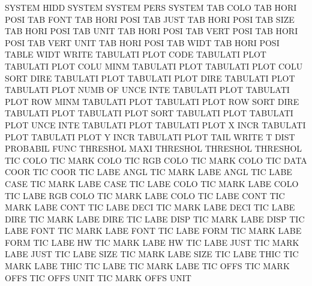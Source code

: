 SYSTEM   HIDD                           SYSTEM
SYSTEM   PERS                           SYSTEM
TAB      COLO                           TAB HORI POSI
TAB      FONT                           TAB HORI POSI
TAB      JUST                           TAB HORI POSI
TAB      SIZE                           TAB HORI POSI
TAB      UNIT                           TAB HORI POSI
TAB      VERT POSI                      TAB HORI POSI
TAB      VERT UNIT                      TAB HORI POSI
TAB      WIDT                           TAB HORI POSI
TABLE    WIDT                           WRITE
TABULATI PLOT CODE                      TABULATI PLOT
TABULATI PLOT COLU MINM                 TABULATI PLOT
TABULATI PLOT COLU SORT DIRE            TABULATI PLOT
TABULATI PLOT DIRE                      TABULATI PLOT
TABULATI PLOT NUMB OF   UNCE INTE       TABULATI PLOT
TABULATI PLOT ROW  MINM                 TABULATI PLOT
TABULATI PLOT ROW  SORT DIRE            TABULATI PLOT
TABULATI PLOT SORT                      TABULATI PLOT
TABULATI PLOT UNCE INTE                 TABULATI PLOT
TABULATI PLOT X    INCR                 TABULATI PLOT
TABULATI PLOT Y    INCR                 TABULATI PLOT
TAIL                                    WRITE
T        DIST                           PROBABIL FUNC
THRESHOL MAXI                           THRESHOL
THRESHOL                                THRESHOL
TIC      COLO                           TIC      MARK COLO
TIC      RGB  COLO                      TIC      MARK COLO
TIC      DATA COOR                      TIC      COOR
TIC      LABE ANGL                      TIC      MARK LABE ANGL
TIC      LABE CASE                      TIC      MARK LABE CASE
TIC      LABE COLO                      TIC      MARK LABE COLO
TIC      LABE RGB  COLO                 TIC      MARK LABE COLO
TIC      LABE CONT                      TIC      MARK LABE CONT
TIC      LABE DECI                      TIC      MARK LABE DECI
TIC      LABE DIRE                      TIC      MARK LABE DIRE
TIC      LABE DISP                      TIC      MARK LABE DISP
TIC      LABE FONT                      TIC      MARK LABE FONT
TIC      LABE FORM                      TIC      MARK LABE FORM
TIC      LABE HW                        TIC      MARK LABE HW
TIC      LABE JUST                      TIC      MARK LABE JUST
TIC      LABE SIZE                      TIC      MARK LABE SIZE
TIC      LABE THIC                      TIC      MARK LABE THIC
TIC      LABE                           TIC      MARK LABE
TIC      OFFS                           TIC      MARK OFFS
TIC      OFFS UNIT                      TIC      MARK OFFS UNIT
